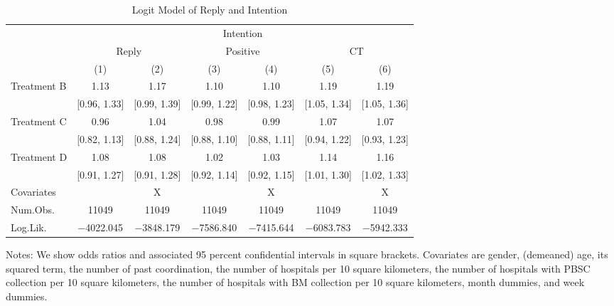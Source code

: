 \documentclass[12pt, a4paper]{article}
\begin{document}
\begin{table}[H]

\caption{\label{tab:stock-logit}Logit Model of Reply and Intention}
\centering
\fontsize{9}{11}\selectfont
\begin{threeparttable}
\begin{tabular}[t]{lcccccc}
\toprule
\multicolumn{3}{c}{ } & \multicolumn{2}{c}{Intention} & \multicolumn{2}{c}{ } \\
\cmidrule(l{3pt}r{3pt}){4-5}
\multicolumn{1}{c}{ } & \multicolumn{2}{c}{Reply} & \multicolumn{2}{c}{Positive} & \multicolumn{2}{c}{CT} \\
\cmidrule(l{3pt}r{3pt}){2-3} \cmidrule(l{3pt}r{3pt}){4-5} \cmidrule(l{3pt}r{3pt}){6-7}
  & (1) & (2) & (3) & (4) & (5) & (6)\\
\midrule
Treatment B & \num{1.13} & \num{1.17} & \num{1.10} & \num{1.10} & \num{1.19} & \num{1.19}\\
 & {}[\num{0.96}, \num{1.33}] & {}[\num{0.99}, \num{1.39}] & {}[\num{0.99}, \num{1.22}] & {}[\num{0.98}, \num{1.23}] & {}[\num{1.05}, \num{1.34}] & {}[\num{1.05}, \num{1.36}]\\
Treatment C & \num{0.96} & \num{1.04} & \num{0.98} & \num{0.99} & \num{1.07} & \num{1.07}\\
 & {}[\num{0.82}, \num{1.13}] & {}[\num{0.88}, \num{1.24}] & {}[\num{0.88}, \num{1.10}] & {}[\num{0.88}, \num{1.11}] & {}[\num{0.94}, \num{1.22}] & {}[\num{0.93}, \num{1.23}]\\
Treatment D & \num{1.08} & \num{1.08} & \num{1.02} & \num{1.03} & \num{1.14} & \num{1.16}\\
 & {}[\num{0.91}, \num{1.27}] & {}[\num{0.91}, \num{1.28}] & {}[\num{0.92}, \num{1.14}] & {}[\num{0.92}, \num{1.15}] & {}[\num{1.01}, \num{1.30}] & {}[\num{1.02}, \num{1.33}]\\
\midrule
Covariates &  & X &  & X &  & X\\
Num.Obs. & \num{11049} & \num{11049} & \num{11049} & \num{11049} & \num{11049} & \num{11049}\\
Log.Lik. & \num{-4022.045} & \num{-3848.179} & \num{-7586.840} & \num{-7415.644} & \num{-6083.783} & \num{-5942.333}\\
\bottomrule
\end{tabular}
\begin{tablenotes}
\item Notes: We show odds ratios and associated 95 percent confidential intervals in square brackets. Covariates are gender, (demeaned) age, its squared term, the number of past coordination, the number of hospitals per 10 square kilometers, the number of hospitals with PBSC collection per 10 square kilometers, the number of hospitals with BM collection per 10 square kilometers, month dummies, and week dummies.
\end{tablenotes}
\end{threeparttable}
\end{table}
\end{document}
